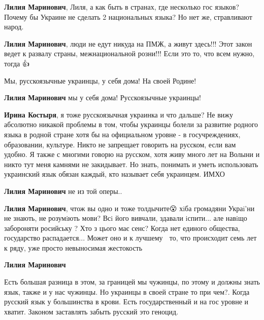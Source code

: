 \begin{itemize}
\begin{itemize}
\textbf{Лилия Маринович}, Лиля, а как быть в странах, где несколько гос языков?
Почему бы Украине не сделать 2 национальных языка? Но нет же, стравливают
народ.

\textbf{Лилия Маринович}, люди не едут никуда на ПМЖ, а живут здесь!!! Этот
закон ведет к развалу страны, межнациональной розни!!! Если это то, что всем
нужно, тогда 👍

Мы, русскоязычные украинцы, у себя дома! На своей Родине!

\textbf{Лилия Маринович} мы у себя дома! Русскоязычные украинцы!

\textbf{Ирина Костыря}, я тоже русскоязычная украинка и что дальше? Не вижу
абсолютно никакой проблемы в том, чтобы украинцы болели за развитие родного
языка в родной стране хотя бы на официальном уровне - в госучреждениях,
образовании, культуре. Никто не запрещает говорить на русском, если вам удобно.
Я также с многими говорю на русском, хотя живу много лет на Волыни и никто тут
меня камнями не закидывает. Но знать, понимать и уметь использовать украинский
язык обязан каждый, кто называет себя украинцем. ИМХО

\textbf{Лилия Маринович} не из той оперы..

\textbf{Лилия Маринович}, чтож вы одно и тоже толдычите😮 хiба громадяни
Украi'ни не знають, не розумiють мови? Всi його вивчали, здавали iспити... але
навiщо забороняти росийську ? Хто з цього має сенс? Когда нет единого общества,
государство распадается... Может оно и к лучшему 🤔 то, что происходит семь лет
к ряду, уже просто невыносимая жестокость 🤮

\textbf{Лилия Маринович}

Есть большая разница в этом, за границей мы чужинцы, по этому и должны знать язык, также и у нас чужинцы.
Но украинцы в своей стране то при чем?. Когда русский язык у большинства в крови.
Есть государственный и на гос уровне и хватит.
Законом заставлять забыть русский это геноцид.


\end{itemize}
\end{itemize}
